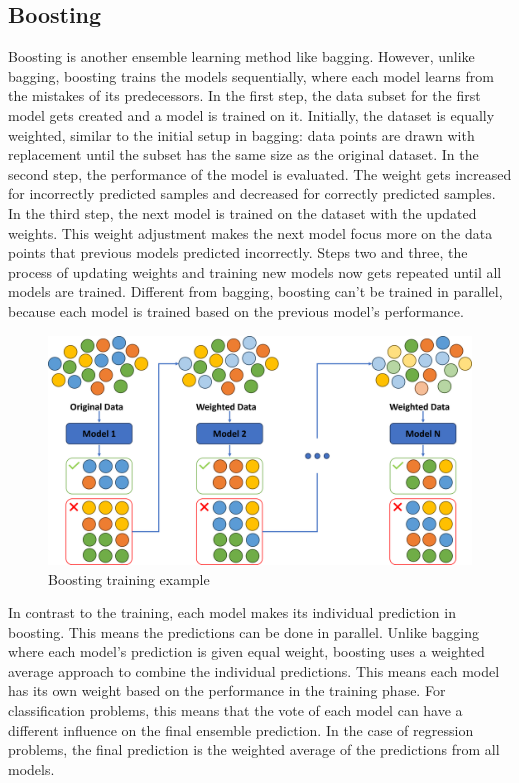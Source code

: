 \subsection{Boosting}
Boosting \citep{Schapire1990} is another ensemble learning method like bagging.
However, unlike bagging, boosting trains the models sequentially, where each
model learns from the mistakes of its predecessors.
In the first step, the data subset for the first model gets created and a model 
is trained on it. Initially, the dataset is equally weighted, similar to the initial
setup in bagging: data points are drawn with replacement until the subset has the 
same size as the original dataset.
In the second step, the performance of the model is evaluated. The weight gets
increased for incorrectly predicted samples and decreased for correctly predicted
samples. 
In the third step, the next model is trained on the dataset with the updated weights.
This weight adjustment makes the next model focus more on the data points that 
previous models predicted incorrectly.
Steps two and three, the process of updating weights and training new models now gets 
repeated until all models are trained.
Different from bagging, boosting can't be trained in parallel, because each model
is trained based on the previous model's performance. 

\begin{figure}[htbp]
    \centering
    \includegraphics[width=.5\textwidth]{figures/boosting_training}
    \caption{Boosting training example}
\end{figure}

In contrast to the training, each model makes its individual prediction in boosting.
This means the predictions can be done in parallel.
Unlike bagging where each model's prediction is given equal weight, boosting uses
a weighted average approach to combine the individual predictions. This means
each model has its own weight based on the performance in the training phase.
For classification problems, this means that the vote of each model can have
a different influence on the final ensemble prediction.
In the case of regression problems, the final prediction is the weighted average
of the predictions from all models.

